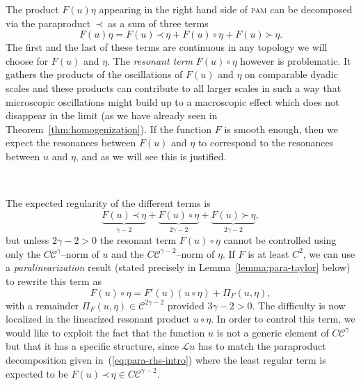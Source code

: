 \documentclass[a4paper,11pt]{article}
\newcommand{\tmem}[1]{{\em #1\/}}
\newcommand{\tmname}[1]{\textsc{#1}}
\newcommand{\LL}{\mathscr{L}}
\newcommand{\CC}{\mathscr{C}}
\newcommand{\lpara}{\,\mathord{\prec}\,}
\newcommand{\rpara}{\,\mathord{\succ}\,}
\newcommand{\reso}{\,\mathord{\circ}\,}
\begin{document}
The product $F (u) \eta$ appearing in the right hand side of {\tmname{pam}}
can be decomposed via the paraproduct $\lpara$ as a sum of three terms
\[ F (u) \eta = F (u) \lpara \eta + F (u) \reso \eta + F (u) \rpara \eta . \]
The first and the last of these terms are continuous in any topology we will choose
for $F (u)$ and $\eta$. The {\tmem{resonant term}} $F (u) \reso \eta$ however
is problematic. It gathers the products of the oscillations of $F (u)$ and
$\eta$ on comparable dyadic scales and these products can contribute to all
larger scales in such a way that microscopic oscillations might build up to a
macroscopic effect which does not disappear in the limit (as we  have already
seen in Theorem~\ref{thm:homogenization}). If the function $F$ is smooth enough, then we expect the resonances
between $F (u)$ and $\eta$ to correspond to the resonances between $u$ and
$\eta$, and as we will see this is justified.

\

The expected regularity of the different terms is
\begin{equation}
  \label{eq:para-rhs-intro} \underbrace{F (u) \lpara \eta}_{\gamma - 2} +
  \underbrace{F (u) \reso \eta}_{2 \gamma - 2} + \underbrace{F (u) \rpara
  \eta}_{2 \gamma - 2},
\end{equation}
but unless $2 \gamma - 2 > 0$ the resonant term $F (u) \reso \eta$ cannot be
controlled using only the $C \CC^{\gamma}$--norm of $u$ and the $C \CC^{\gamma
- 2}$--norm of $\eta$. If $F$ is at least $C^2$, we can use a
{\tmem{paralinearization}} result (stated precisely in
Lemma~\ref{lemma:para-taylor} below) to rewrite this term as
\begin{equation}
  \label{eq:rde expand Fu} F (u) \reso \eta = F' (u)  (u \reso \eta) + \Pi_F
  (u, \eta),
\end{equation}
with a remainder $\Pi_F (u, \eta) \in \CC^{2 \gamma - 2}$ provided $3 \gamma -
2 > 0$. The difficulty is now localized in the linearized resonant product $u
\reso \eta$. In order to control this term, we would like to exploit the fact
that the function $u$ is not a generic element of $C \CC^{\gamma}$ but that it
has a specific structure, since $\LL u$ has to match the paraproduct
decomposition given in~(\ref{eq:para-rhs-intro}) where the least regular term
is expected to be $F (u) \lpara \eta \in C \CC^{\gamma - 2}$.
\end{document}
